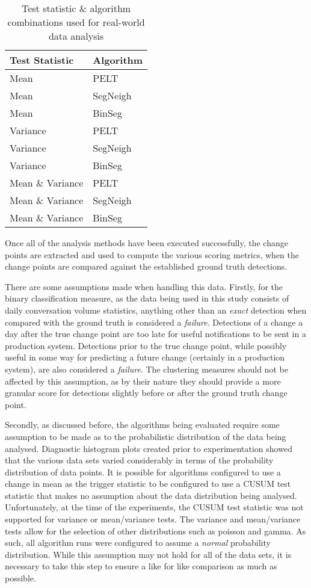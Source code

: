 \documentclass[../main.tex]{subfiles}
\begin{document}
\begin{table}[h]
\centering
\begin{tabular}{@{}ll@{}}
\toprule
\textbf{Test Statistic} & \textbf{Algorithm} \\ \midrule
Mean & PELT \\
Mean & SegNeigh \\
Mean & BinSeg \\
Variance & PELT \\
Variance & SegNeigh \\
Variance & BinSeg \\
Mean \& Variance & PELT \\
Mean \& Variance & SegNeigh \\
Mean \& Variance & BinSeg \\ \bottomrule
\end{tabular}
\caption{Test statistic \& algorithm combinations used for real-world data analysis}
\end{table}

Once all of the analysis methods have been executed successfully, the change points are extracted and used to compute the various scoring metrics, when the change points are compared against the established ground truth detections.

There are some assumptions made when handling this data. Firstly, for the binary classification measure, as the data being used in this study consists of daily conversation volume statistics, anything other than an \emph{exact} detection when compared with the ground truth is considered a \emph{failure}. Detections of a change a day after the true change point are too late for useful notifications to be sent in a production system. Detections prior to the true change point, while possibly useful in some way for predicting a future change (certainly in a production system), are also considered a \emph{failure}. The clustering measures should not be affected by this assumption, as by their nature they should provide a more granular score for detections slightly before or after the ground truth change point.

Secondly, as discussed before, the algorithms being evaluated require some assumption to be made as to the probabilistic distribution of the data being analysed. Diagnostic histogram plots created prior to experimentation showed that the various data sets varied considerably in terms of the probability distribution of data points. It is possible for algorithms configured to use a change in mean as the trigger statistic to be configured to use a CUSUM test statistic that makes no assumption about the data distribution being analysed. Unfortunately, at the time of the experiments, the CUSUM test statistic was not supported for variance or mean/variance tests. The variance and mean/variance tests allow for the selection of other distributions such as poisson and gamma. As such, all algorithm runs were configured to assume a \emph{normal} probability distribution. While this assumption may not hold for all of the data sets, it is necessary to take this step to ensure a like for like comparison as much as possible.
\end{document}
